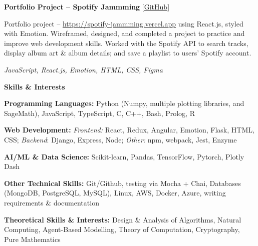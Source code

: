\documentclass[12pt, a4paper]{article}
\begin{document}
    
\textbf{Portfolio Project -- Spotify Jammming} \hfill [\href{https://github.com/m-usaid99/spotify-jammming}{GitHub}]
    \begin{center}
        \parbox{0.9\linewidth}{
            Portfolio project -- \url{https://spotify-jammming.vercel.app} using React.js, styled with Emotion. Wireframed, designed, and completed a project to practice and improve web development skills. Worked with the Spotify API to search tracks, display album art \& album details; and save a playlist to users' Spotify account. 

            \textit{JavaScript, React.js, Emotion, HTML, CSS, Figma}
        }
    \end{center}

\begin{center}
    \large\textbf{Skills \& Interests}
\end{center}

\textbf{Programming Languages:} Python (Numpy, multiple plotting libraries, and SageMath), JavaScript, TypeScript, C, C++, Bash, Prolog, R

\textbf{Web Development:} \textit{Frontend:} React, Redux, Angular, Emotion, Flask, HTML, CSS; \textit{Backend}: Django, Express, Node; \textit{Other:} npm, webpack, Jest, Enzyme

\textbf{AI/ML \& Data Science:} Scikit-learn, Pandas, TensorFlow, Pytorch, Plotly Dash 

\textbf{Other Technical Skills:} Git/Github, testing via Mocha + Chai, Databases (MongoDB, PostgreSQL, MySQL), Linux, AWS, Docker, Azure, writing requirements \& documentation

\textbf{Theoretical Skills \& Interests:} Design \& Analysis of Algorithms, Natural Computing, Agent-Based Modelling, Theory of Computation, Cryptography, Pure Mathematics
\end{document}
